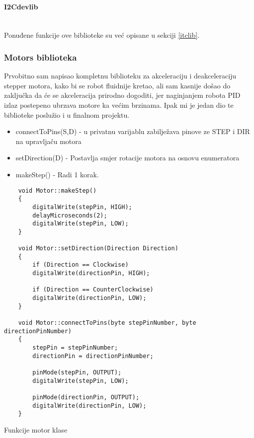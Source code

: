 \documentclass[../Document.tex]{subfiles}
\begin{document}
\paragraph{I2Cdevlib}\mbox{}\\
\noindent Ponuđene funkcije ove biblioteke su već opisane u sekciji \ref{itclib}.

\subsubsection{Motors biblioteka}
Prvobitno sam napisao kompletnu biblioteku za akceleraciju i deakceleraciju stepper motora, kako bi se robot fluidnije kretao, ali sam kasnije došao do zaključka da će se akceleracija prirodno dogoditi, jer naginjanjem robota PID izlaz postepeno ubrzava motore ka većim brzinama. Ipak mi je jedan dio te biblioteke poslužio i u finalnom projektu.

\begin{itemize}
    \item connectToPins(S,D) - u privatnu varijablu zabilježava pinove ze STEP i DIR na upravljaču motora
    \item setDirection(D) - Postavlja smjer rotacije motora na osnovu enumeratora
    \item makeStep() - Radi 1 korak.
\end{itemize}

\begin{code}
    \begin{verbatim}
    void Motor::makeStep()
    {
        digitalWrite(stepPin, HIGH);
        delayMicroseconds(2);
        digitalWrite(stepPin, LOW);
    }

    void Motor::setDirection(Direction Direction)
    {
        if (Direction == Clockwise)
        digitalWrite(directionPin, HIGH);

        if (Direction == CounterClockwise)
        digitalWrite(directionPin, LOW);
    }

    void Motor::connectToPins(byte stepPinNumber, byte directionPinNumber)
    {
        stepPin = stepPinNumber;
        directionPin = directionPinNumber;
        
        pinMode(stepPin, OUTPUT);
        digitalWrite(stepPin, LOW);

        pinMode(directionPin, OUTPUT);
        digitalWrite(directionPin, LOW);
    }
    \end{verbatim}
    \caption{Funkcije motor klase}
\end{code}
\end{document}
